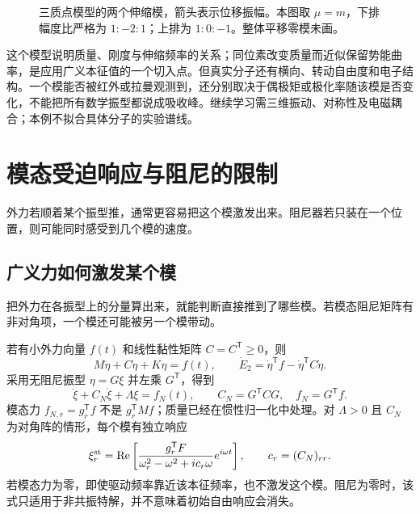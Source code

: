 \begin{figure}[htbp]
\centering
{}
\caption{三质点模型的两个伸缩模，箭头表示位移振幅。本图取 $\mu=m$，下排幅度比严格为 $1:-2:1$；上排为 $1:0:-1$。整体平移零模未画。}
\label{fig:triatomic}
\end{figure}

\begin{modernbox}[title={进一步探索：从振型到光谱还缺什么？}]
这个模型说明质量、刚度与伸缩频率的关系；同位素改变质量而近似保留势能曲率，是应用广义本征值的一个切入点。但真实分子还有横向、转动自由度和电子结构。一个模能否被红外或拉曼观测到，还分别取决于偶极矩或极化率随该模是否变化，不能把所有数学振型都说成吸收峰。继续学习需三维振动、对称性及电磁耦合；本例不拟合具体分子的实验谱线。
\end{modernbox}


\section{模态受迫响应与阻尼的限制}
外力若顺着某个振型推，通常更容易把这个模激发出来。阻尼器若只装在一个位置，则可能同时感受到几个模的速度。

\subsection{广义力如何激发某个模}
把外力在各振型上的分量算出来，就能判断直接推到了哪些模。若模态阻尼矩阵有非对角项，一个模还可能被另一个模带动。

若有小外力向量 $f(t)$ 和线性黏性矩阵 $C=C^{\mathsf T}\ge0$，则
\begin{equation}
M\ddot\eta+C\dot\eta+K\eta=f(t),\qquad
\dot E_2=\dot\eta^{\mathsf T}f-\dot\eta^{\mathsf T}C\dot\eta.
\label{eq:osc-multi-driven}
\end{equation}
采用无阻尼振型 $\eta=G\xi$ 并左乘 $G^{\mathsf T}$，得到
\[
\ddot\xi+C_N\dot\xi+\Lambda\xi=f_N(t),\qquad
C_N=G^{\mathsf T}CG,\quad f_N=G^{\mathsf T}f.
\]
模态力 $f_{N,r}=g_r^{\mathsf T}f$ 不是 $g_r^{\mathsf T}Mf$；质量已经在惯性归一化中处理。对 $\Lambda>0$ 且 $C_N$ 为对角阵的情形，每个模有独立响应
\[
\xi_r^{\rm st}=\operatorname{Re}\left[
\frac{g_r^{\mathsf T}F}{\omega_r^2-\omega^2+i c_r\omega}e^{i\omega t}\right],\qquad
c_r=(C_N)_{rr}.
\]
若模态力为零，即使驱动频率靠近该本征频率，也不激发这个模。阻尼为零时，该式只适用于非共振特解，并不意味着初始自由响应会消失。

